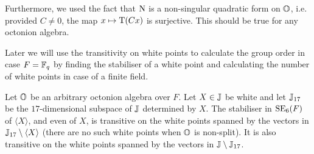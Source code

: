 Furthermore, we used the fact that $\mathord{\mathrm{N}}$ is a non-singular
quadratic form on $\mathbb{O}$, i.e. provided $C \neq 0$, the map $x \mapsto \operatorname{T}(Cx)$ is 
surjective. This should be true for any octonion algebra.

Later we will use the transitivity on white points to calculate the group order
in case $F = \mathbb{F}_q$ by finding the stabiliser of a white point and calculating the
number of white points in case of a finite field. 

\begin{lemma}
	Let $\mathbb{O}$ be an arbitrary octonion algebra over $F$.
	Let $X \in \mathbb{J}$ be white and let $\mathbb{J}_{17}$ be the 
	$17$-dimensional subspace of $\mathbb{J}$ determined by $X$. The stabiliser in
	$\mathrm{SE}_6(F)$ of $\langle X \rangle$, and even of $X$, is transitive on the white points 
	spanned by the vectors in $\mathbb{J}_{17} \setminus \langle X \rangle$ (there are no such
	white points when $\mathbb{O}$ is non-split). It is also
	transitive on the white points spanned by the vectors in $\mathbb{J} \setminus
	\mathbb{J}_{17}$. 
\end{lemma}

